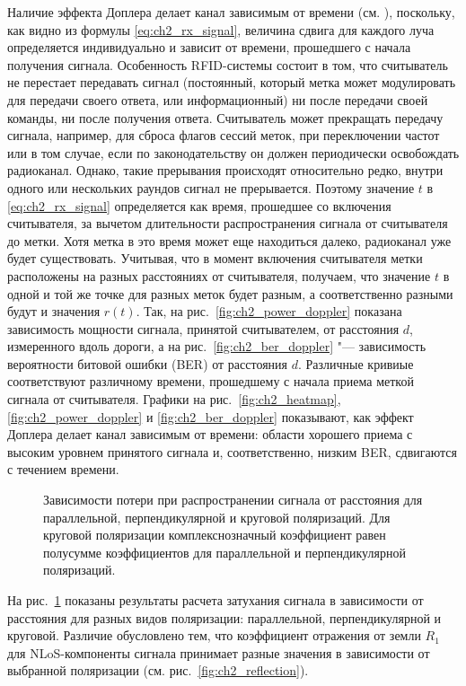 Наличие эффекта Доплера делает канал зависимым от времени (см. \cite{Matz2011}), поскольку, как видно из формулы \eqref{eq:ch2_rx_signal}, величина сдвига для каждого луча определяется индивидуально и зависит от времени, прошедшего с начала получения сигнала. Особенность RFID-системы состоит в том, что считыватель не перестает передавать сигнал (постоянный, который метка может модулировать для передачи своего ответа, или информационный) ни после передачи своей команды, ни после получения ответа. Считыватель может прекращать передачу сигнала, например, для сброса флагов сессий меток, при переключении частот или в том случае, если по законодательству он должен периодически освобождать радиоканал. Однако, такие прерывания происходят относительно редко, внутри одного или нескольких раундов сигнал не прерывается. Поэтому значение $t$ в \eqref{eq:ch2_rx_signal} определяется как время, прошедшее со включения считывателя, за вычетом длительности распространения сигнала от считывателя до метки. Хотя метка в это время может еще находиться далеко, радиоканал уже будет существовать. Учитывая, что в момент включения считывателя метки расположены на разных расстояниях от считывателя, получаем, что значение $t$ в одной и той же точке для разных меток будет разным, а соответственно разными будут и значения $r(t)$. Так, на рис.~\ref{fig:ch2_power_doppler} показана зависимость мощности сигнала, принятой считывателем, от расстояния $d$, измеренного вдоль дороги, а на рис.~\ref{fig:ch2_ber_doppler} "--- зависимость вероятности битовой ошибки (BER) от расстояния $d$. Различные кривиые соответствуют различному времени, прошедшему с начала приема меткой сигнала от считывателя. Графики на рис.~\ref{fig:ch2_heatmap}, \ref{fig:ch2_power_doppler} и \ref{fig:ch2_ber_doppler} показывают, как эффект Доплера делает канал зависимым от времени: области хорошего приема с высоким уровнем принятого сигнала и, соответственно, низким BER, сдвигаются с течением времени.

\begin{figure}[!t]
	\caption{Зависимости потери при распространении сигнала от расстояния для параллельной, перпендикулярной и круговой поляризаций. Для круговой поляризации комплекснозначный коэффициент равен полусумме коэффициентов для параллельной и перпендикулярной поляризаций.}
	\label{fig:ch2_pathloss_cases}
\end{figure}

На рис.~\ref{fig:ch2_pathloss_cases} показаны результаты расчета затухания сигнала в зависимости от расстояния для разных видов поляризации: параллельной, перпендикулярной и круговой. Различие обусловлено тем, что коэффициент отражения от земли $R_1$ для NLoS-компоненты сигнала принимает разные значения в зависимости от выбранной поляризации (см. рис.~\ref{fig:ch2_reflection}).


